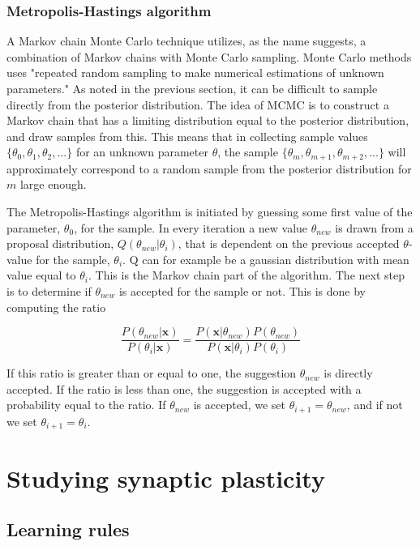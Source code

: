 \subsubsection{Metropolis-Hastings algorithm}
\label{Metropolis}
A Markov chain Monte Carlo technique utilizes, as the name suggests, a combination of Markov chains with Monte Carlo sampling. Monte Carlo methods uses "repeated random sampling to make numerical estimations of unknown parameters."  
As noted in the previous section, it can be difficult to sample directly from the posterior distribution. The idea of MCMC is to construct a Markov chain that has a limiting distribution equal to the posterior distribution, and draw samples from this. This means that in collecting sample values $\{\theta_0, \theta_1, \theta_2,...\}$ for an unknown parameter $\theta$, the sample $\{\theta_m, \theta_{m+1}, \theta_{m+2},...\}$ will approximately correspond to a random sample from the posterior distribution for $m$ large enough. 

The Metropolis-Hastings algorithm is initiated by guessing some first value of the parameter, $\theta_0$, for the sample. In every iteration a new value $\theta_{new}$ is drawn from a proposal distribution, $Q(\theta_{new}|\theta_i)$, that is dependent on the previous accepted $\theta$-value for the sample, $\theta_i$. Q can for example be a gaussian distribution with mean value equal to $\theta_i$. This is the Markov chain part of the algorithm. The next step is to determine if $\theta_{new}$ is accepted for the sample or not. This is done by computing the ratio

\begin{equation}
    \frac{P(\theta_{new}|{\bm x})}{P(\theta_i|{\bm x})} = 
    \frac{P({\bm x}|\theta_{new})P(\theta_{new})}{P({\bm x}|\theta_{i})P(\theta_{i})}
\end{equation}

If this ratio is greater than or equal to one, the suggestion $\theta_{new}$ is directly accepted. If the ratio is less than one, the suggestion is accepted with a probability equal to the ratio. If $\theta_{new}$ is accepted, we set $\theta_{i+1} = \theta_{new}$, and if not we set $\theta_{i+1} = \theta_i$.

\section{Studying synaptic plasticity}
\subsection{Learning rules}

